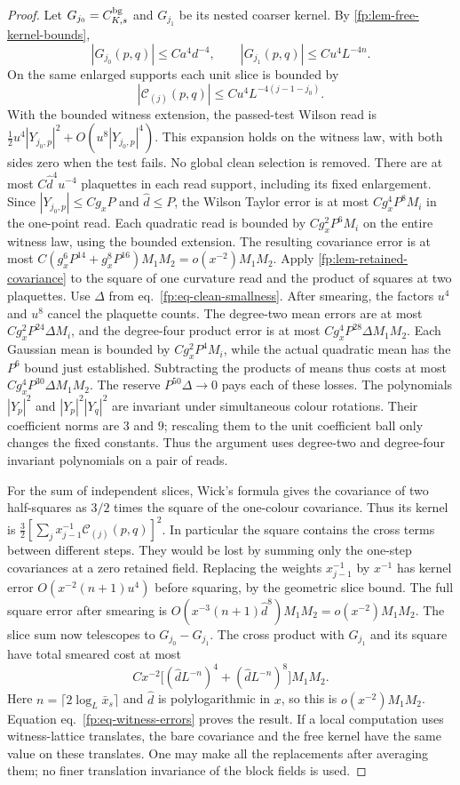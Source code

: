 \documentclass[11pt,letterpaper,reqno]{amsart}
\numberwithin{equation}{section}
\renewcommand{\eqref}[1]{\textup{eq.~\ref{#1}}}
\theoremstyle{definition}
\theoremstyle{remark}
\begin{document}
\begin{proof}
Let $G_{j_0}=C^{\rm bg}_{K,s}$ and $G_{j_1}$ be its nested
coarser kernel. By \cref{fp:lem-free-kernel-bounds},
\[
 |G_{j_0}(p,q)|\le C a^4 d^{-4},\qquad
 |G_{j_1}(p,q)|\le C u^4 L^{-4n}.
\]
On the same enlarged supports each unit slice is bounded by
\[
 |\mathcal C_{(j)}(p,q)|\le C u^4 L^{-4(j-1-j_0)}.
\]
With the bounded witness extension, the passed-test Wilson
read is \(\tfrac12u^4|Y_{j_0,p}|^2+O(u^8|Y_{j_0,p}|^4)\).
This expansion holds on the witness law, with both sides zero
when the test fails. No global clean selection is removed.
There are at most $C\widehat d^4u^{-4}$ plaquettes in
each read support, including its fixed enlargement.
Since $|Y_{j_0,p}|\le Cg_xP$ and $\widehat d\le P$, the
Wilson Taylor error is at most $Cg_x^4P^8M_i$ in the one-point
read. Each quadratic read is bounded by $Cg_x^2P^6M_i$ on the
entire witness law, using the bounded extension. The resulting covariance error is at most
$C(g_x^6P^{14}+g_x^8P^{16})M_1M_2=o(x^{-2})M_1M_2$.
Apply \cref{fp:lem-retained-covariance} to the square of one
curvature read and the product of squares at two plaquettes.
Use \(\Delta\) from \eqref{fp:eq-clean-smallness}.
After smearing, the factors $u^4$ and $u^8$ cancel the
plaquette counts. The degree-two mean errors are at most
$C g_x^2P^{24}\Delta M_i$, and the degree-four product error
is at most $C g_x^4P^{28}\Delta M_1M_2$. Each Gaussian mean is
bounded by $C g_x^2P^4 M_i$, while the actual quadratic mean
has the $P^6$ bound just established. Subtracting the products
of means thus costs at most $C g_x^4P^{30}\Delta M_1M_2$.
The reserve $P^{50}\Delta\to0$ pays each of these losses.
The polynomials \(|Y_p|^2\) and \(|Y_p|^2|Y_q|^2\)
are invariant under simultaneous colour rotations. Their
coefficient norms are \(3\) and \(9\); rescaling them to the
unit coefficient ball only changes the fixed constants.
Thus the argument uses degree-two and degree-four invariant
polynomials on a pair of reads.

For the sum of independent slices, Wick's formula gives
the covariance of two half-squares as $3/2$ times the
square of the one-colour covariance. Thus its kernel is
$\tfrac32[\sum_j x_{j-1}^{-1}\mathcal C_{(j)}(p,q)]^2$.
In particular the square contains the cross terms between
different steps. They would be lost by summing only the
one-step covariances at a zero retained field. Replacing
the weights $x_{j-1}^{-1}$ by $x^{-1}$ has kernel error
$O(x^{-2}(n+1)u^4)$ before squaring, by the geometric slice
bound. The full square error after smearing is
$O(x^{-3}(n+1)\widehat d^8)M_1M_2=o(x^{-2})M_1M_2$.
The slice sum now telescopes to $G_{j_0}-G_{j_1}$.
The cross product with $G_{j_1}$ and its square have
total smeared cost at most
\[
 Cx^{-2}\big[(\widehat d L^{-n})^4
              +(\widehat d L^{-n})^8\big]M_1M_2 .
\]
Here $n=\lceil2\log_L\bar x_s\rceil$ and $\widehat d$ is
polylogarithmic in $x$, so this is $o(x^{-2})M_1M_2$.
Equation \eqref{fp:eq-witness-errors} proves the result.
If a local computation uses witness-lattice translates, the
bare covariance and the free kernel have the same value on
these translates. One may make all the replacements after
averaging them; no finer translation invariance of the block
fields is used.
\end{proof}
\end{document}
